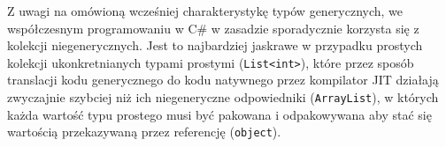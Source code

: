 Z uwagi na omówioną wcześniej charakterystykę typów generycznych, 
we współczesnym programowaniu w C\# w zasadzie sporadycznie korzysta się z kolekcji niegenerycznych. Jest to
najbardziej jaskrawe w przypadku prostych kolekcji ukonkretnianych typami prostymi ({\tt List<int>}), które przez
sposób translacji kodu generycznego do kodu natywnego przez kompilator JIT działają zwyczajnie szybciej niż
ich niegeneryczne odpowiedniki ({\tt ArrayList}), w których każda wartość typu prostego musi być pakowana i odpakowywana
aby stać się wartością przekazywaną przez referencję ({\tt object}).

